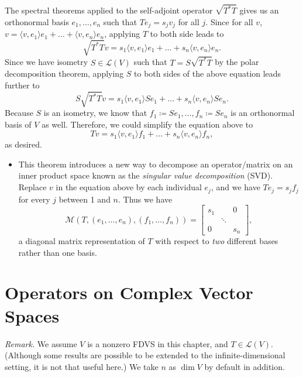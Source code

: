 \documentclass[11pt]{article}
\newcommand{\df}[1]{\textit{\textsf{#1}}}
\renewcommand{\d}{\dim}
\newcommand{\inp}[2]{\langle #1, #2 \rangle}
\newcommand{\LV}{\mathcal{L}(V)}
\newcommand{\M}{\mathcal{M}}
\begin{document}
\begin{itemize}
The spectral theorems applied to the self-adjoint operator $\sqrt{T^*T}$ gives us an orthonormal basis $e_1,\dots,e_n$ such that $Te_j = s_j v_j$ for all $j$. Since for all $v$, $v = \inp{v}{e_1}e_1 + \dots + \inp{v}{e_n}e_n$, applying $T$ to both side leads to $$\sqrt{T^*T}v = s_1\inp{v}{e_1}e_1 + \dots + s_n\inp{v}{e_n}e_n.$$ Since we have isometry $S \in \LV$ such that $T = S \sqrt{T^*T}$ by the polar decomposition theorem, applying $S$ to both sides of the above equation leads further to $$S\sqrt{T^*T}v = s_1\inp{v}{e_1}Se_1 + \dots + s_n\inp{v}{e_n}Se_n.$$ Because $S$ is an isometry, we know that $f_1 \coloneqq Se_1,\dots,f_n \coloneqq Se_n$ is an orthonormal basis of $V$ as well. Therefore, we could simplify the equation above to $$Tv = s_1 \inp{v}{e_1}f_1 + \dots + s_n \inp{v}{e_n}f_n,$$ as desired.
\begin{itemize}
	\item This theorem introduces a new way to decompose an operator/matrix on an inner product space known as the \df{singular value decomposition} (SVD). Replace $v$ in the equation above by each individual $e_j$, and we have $Te_j = s_jf_j$ for every $j$ between 1 and $n$. Thus we have
	\begin{equation*}
		\M(T,(e_1,\dots,e_n),(f_1,\dots,f_n)) = \begin{bmatrix}
		s_1 & & 0 \\
		 & \ddots & \\
		 0 & & s_n
		\end{bmatrix},
	\end{equation*}
a diagonal matrix representation of $T$ with respect to \emph{two} different bases rather than one basis.
\end{itemize}
\end{itemize}


\newpage
\section{Operators on Complex Vector Spaces}
\textit{Remark.} We assume $V$ is a nonzero FDVS in this chapter, and $T \in \LV$. (Although some results are possible to be extended to the infinite-dimensional setting, it is not that useful here.) We take $n$ as $\d V$ by default in addition.
\end{document}
